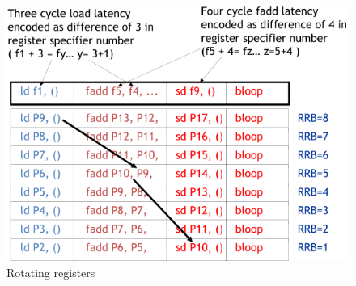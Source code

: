 \begin{figure}[h]
    \centering
    \includegraphics[scale = 0.4]{images/rotating-register-file-2}
    \caption{Rotating registers}
    \label{fig:rotating-registers}
\end{figure}